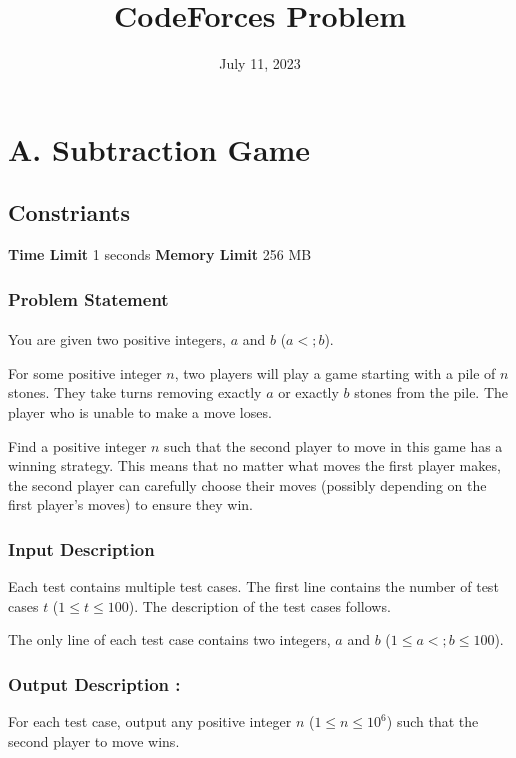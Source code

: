 \documentclass{article}
\title{CodeForces Problem}
\date{July 11, 2023}
\author{}
\begin{document}
\maketitle
\newcommand{\lt}{\ensuremath <}
\newcommand{\gt}{\ensuremath >}
\section*{A. Subtraction Game}
\subsection*{Constriants}
\textbf{Time Limit}
1 seconds
\hfill
\textbf{Memory Limit}
256 MB
\subsubsection*{Problem Statement}
\paragraph{}You are given two positive integers, $a$ and $b$ ($a <; b$).

For some positive integer $n$, two players will play a game starting with a pile of $n$ stones. They take turns removing exactly $a$ or exactly $b$ stones from the pile. The player who is unable to make a move loses.

Find a positive integer $n$ such that the second player to move in this game has a winning strategy. This means that no matter what moves the first player makes, the second player can carefully choose their moves (possibly depending on the first player's moves) to ensure they win.
\paragraph{}
\subsubsection*{Input Description}Each test contains multiple test cases. The first line contains the number of test cases $t$ ($1 \le t \le 100$). The description of the test cases follows.

The only line of each test case contains two integers, $a$ and $b$ ($1 \le a <; b \le 100$).
\paragraph{}
\subsubsection*{Output Description : }For each test case, output any positive integer $n$ ($1 \le n \le 10^6$) such that the second player to move wins.
\end{document}
